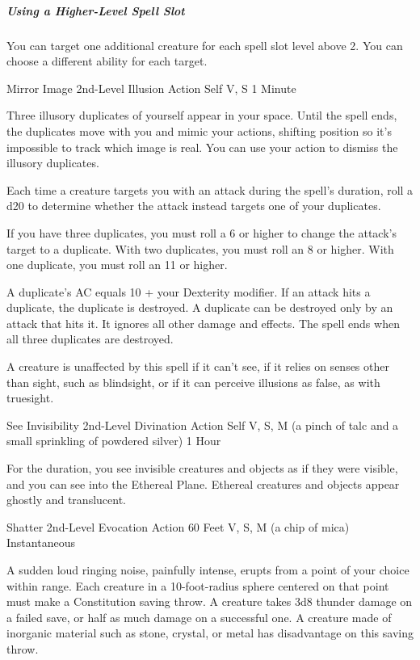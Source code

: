 \documentclass[letterpaper,openany,oneside,twocolumn]{book}
\begin{document}
\subparagraph*{Using a Higher-Level Spell Slot} You can target one additional creature for each spell slot level above 2. You can choose a different ability for each target.

\DndSpellHeader
  {Mirror Image}
  {2nd-Level Illusion}
  {Action}
  {Self}
  {V, S}
  {1 Minute}

Three illusory duplicates of yourself appear in your space. Until the spell ends, the duplicates move with you and mimic your actions, shifting position so it's impossible to track which image is real. You can use your action to dismiss the illusory duplicates.

Each time a creature targets you with an attack during the spell's duration, roll a d20 to determine whether the attack instead targets one of your duplicates.

If you have three duplicates, you must roll a 6 or higher to change the attack's target to a duplicate. With two duplicates, you must roll an 8 or higher. With one duplicate, you must roll an 11 or higher.

A duplicate's AC equals 10 + your Dexterity modifier. If an attack hits a duplicate, the duplicate is destroyed. A duplicate can be destroyed only by an attack that hits it. It ignores all other damage and effects. The spell ends when all three duplicates are destroyed.

A creature is unaffected by this spell if it can't see, if it relies on senses other than sight, such as blindsight, or if it can perceive illusions as false, as with truesight.

\DndSpellHeader
  {See Invisibility}
  {2nd-Level Divination}
  {Action}
  {Self}
  {V, S, M (a pinch of talc and a small sprinkling of powdered silver)}
  {1 Hour}
  
For the duration, you see invisible creatures and objects as if they were visible, and you can see into the Ethereal Plane. Ethereal creatures and objects appear ghostly and translucent.

\DndSpellHeader
  {Shatter}
  {2nd-Level Evocation}
  {Action}
  {60 Feet}
  {V, S, M (a chip of mica)}
  {Instantaneous}

A sudden loud ringing noise, painfully intense, erupts from a point of your choice within range. Each creature in a 10-foot-radius sphere centered on that point must make a Constitution saving throw. A creature takes 3d8 thunder damage on a failed save, or half as much damage on a successful one. A creature made of inorganic material such as stone, crystal, or metal has disadvantage on this saving throw.
\end{document}
